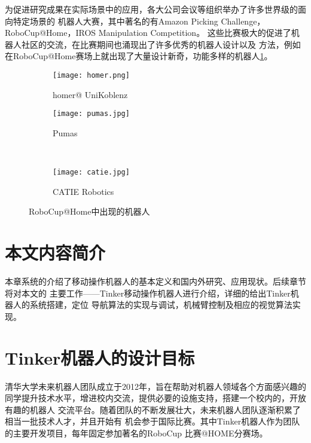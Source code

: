 为促进研究成果在实际场景中的应用，各大公司会议等组织举办了许多世界级的面向特定场景的
机器人大赛，其中著名的有Amazon Picking Challenge\cite{wurman2016amazon}，
RoboCup@Home\cite{wisspeintner2009robocup}，IROS Manipulation Competition\cite{moon2017iros}。
这些比赛极大的促进了机器人社区的交流，在比赛期间也涌现出了许多优秀的机器人设计以及
方法，例如在RoboCup@Home赛场上就出现了大量设计新奇，功能多样的机器人\ref{fig:other_teams}。

\begin{figure}
    \centering
    \begin{minipage}{.45\linewidth}
            \begin{subfigure}[t]{.9\linewidth}
                \texttt{[image: homer.png]}
                \caption{homer@ UniKoblenz}
            \end{subfigure}
    \end{minipage}
    \begin{minipage}{.45\linewidth}
        \begin{subfigure}[t]{.8\linewidth}
            \texttt{[image: pumas.jpg]}
            \caption{Pumas}
        \end{subfigure} \\
        \begin{subfigure}[b]{.8\linewidth}
            \texttt{[image: catie.jpg]}
            \caption{CATIE Robotics}
        \end{subfigure} 
    \end{minipage}
    \caption{RoboCup@Home中出现的机器人}
    \label{fig:other_teams}
\end{figure}

\section{本文内容简介}

本章系统的介绍了移动操作机器人的基本定义和国内外研究、应用现状。后续章节将对本文的
主要工作——Tinker移动操作机器人进行介绍，详细的给出Tinker机器人的系统搭建，定位
导航算法的实现与调试，机械臂控制及相应的视觉算法实现。

\iffalse
\section{Tinker机器人的设计目标}

清华大学未来机器人团队成立于2012年，旨在帮助对机器人领域各个方面感兴趣的
同学提升技术水平，增进校内交流，提供必要的设施支持，搭建一个校内的，开放有趣的机器人
交流平台。随着团队的不断发展壮大，未来机器人团队逐渐积累了相当一批技术人才，并且开始有
机会参于国际比赛。其中Tinker机器人作为团队的主要开发项目，每年固定参加著名的RoboCup
比赛@HOME分赛场\cite{wisspeintner2009robocup}。

